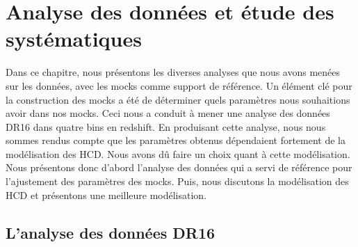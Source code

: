 
% 

% 


\graphicspath{ {../figures/data_ana/} }

\chapter{Analyse des données et étude des systématiques}
\label{chap:data_ana}
\minitoc
\newpage
\thispagestyle{fancy}

Dans ce chapitre, nous présentons les diverses analyses que nous avons menées sur les données, avec les mocks comme support de référence.
Un élément clé pour la construction des mocks a été de déterminer quels paramètres \lya{} nous souhaitions avoir dans nos mocks.
Ceci nous a conduit à mener une analyse des données DR16 dans quatre bins en redshift.
En produisant cette analyse, nous nous sommes rendus compte que les paramètres \lya{} obtenus dépendaient fortement de la modélisation des HCD. Nous avons dû faire un choix quant à cette modélisation.
Nous présentons donc d'abord l'analyse des données qui a servi de référence pour l'ajustement des paramètres des mocks. Puis, nous discutons la modélisation des HCD et présentons une meilleure modélisation.



\section{L'analyse des données DR16}
